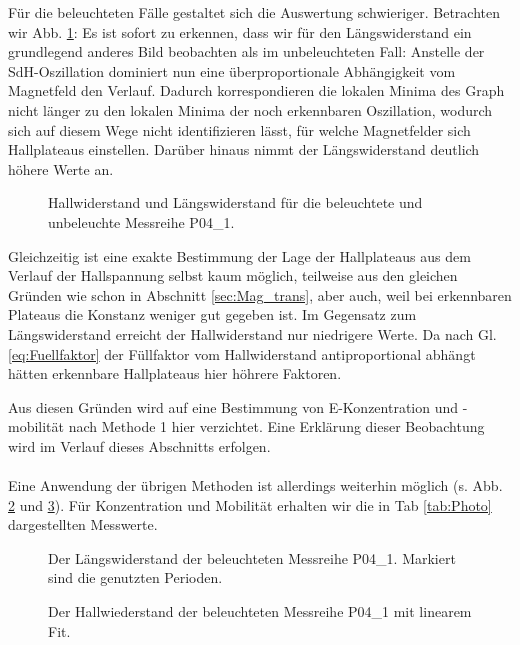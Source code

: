 Für die beleuchteten Fälle gestaltet sich die Auswertung schwieriger. Betrachten wir Abb. \ref{abb:P04_Compare}: Es ist sofort zu erkennen, dass wir für den Längswiderstand ein grundlegend anderes Bild beobachten als im unbeleuchteten Fall: Anstelle der SdH-Oszillation dominiert nun eine überproportionale Abhängigkeit vom Magnetfeld den Verlauf. Dadurch korrespondieren die lokalen Minima des Graph nicht länger zu den lokalen Minima der noch erkennbaren Oszillation, wodurch sich auf diesem Wege nicht identifizieren lässt, für welche Magnetfelder sich Hallplateaus einstellen. Darüber hinaus nimmt der Längswiderstand deutlich höhere Werte an.

\begin{figure}[h!]
	\centering
	
	\caption{Hallwiderstand und Längswiderstand für die beleuchtete und unbeleuchte Messreihe P04\_1.}
	\label{abb:P04_Compare}
\end{figure}
Gleichzeitig ist eine exakte Bestimmung der Lage der Hallplateaus aus dem Verlauf der Hallspannung selbst kaum möglich, teilweise aus den gleichen Gründen wie schon in Abschnitt \ref{sec:Mag_trans}, aber auch, weil bei erkennbaren Plateaus die Konstanz weniger gut gegeben ist. Im Gegensatz zum Längswiderstand erreicht der Hallwiderstand nur niedrigere Werte. Da nach Gl. \ref{eq:Fuellfaktor} der Füllfaktor vom Hallwiderstand antiproportional abhängt hätten erkennbare Hallplateaus hier höhrere Faktoren.
 
Aus diesen Gründen wird auf eine Bestimmung von E-Konzentration und -mobilität nach Methode 1 hier verzichtet. Eine Erklärung dieser Beobachtung wird im Verlauf dieses Abschnitts erfolgen. \\
\\
Eine Anwendung der übrigen Methoden ist allerdings weiterhin möglich (s. Abb. \ref{abb:P04_Meth_2} und \ref{abb:P04_Meth_3}).
Für Konzentration und Mobilität erhalten wir die in Tab \ref{tab:Photo} dargestellten Messwerte. \\


\begin{figure}[h!]
	\centering
	
	\caption{Der Längswiderstand der beleuchteten Messreihe P04\_1. Markiert sind die genutzten Perioden.}
	\label{abb:P04_Meth_2}
\end{figure}

\begin{figure}[h!]
	\centering
	
	\caption{Der Hallwiederstand der beleuchteten Messreihe P04\_1 mit linearem Fit.}
	\label{abb:P04_Meth_3}
\end{figure}

